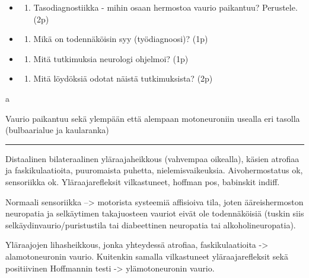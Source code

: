 \documentclass[
]{book}
\providecommand{\tightlist}{%
  \setlength{\itemsep}{0pt}\setlength{\parskip}{0pt}}
\begin{document}
\begin{itemize}
\tightlist
\item
  \begin{enumerate}
  \def\labelenumi{\alph{enumi}.}
  \tightlist
  \item
    Tasodiagnostiikka - mihin osaan hermostoa vaurio paikantuu? Perustele. (2p)
  \end{enumerate}
\item
  \begin{enumerate}
  \def\labelenumi{\alph{enumi}.}
  \setcounter{enumi}{1}
  \tightlist
  \item
    Mikä on todennäköisin syy (työdiagnoosi)? (1p)
  \end{enumerate}
\item
  \begin{enumerate}
  \def\labelenumi{\alph{enumi}.}
  \setcounter{enumi}{2}
  \tightlist
  \item
    Mitä tutkimuksia neurologi ohjelmoi? (1p)
  \end{enumerate}
\item
  \begin{enumerate}
  \def\labelenumi{\alph{enumi}.}
  \setcounter{enumi}{3}
  \tightlist
  \item
    Mitä löydöksiä odotat näistä tutkimuksista? (2p)
  \end{enumerate}
\end{itemize}

a

Vaurio paikantuu sekä ylempään että alempaan motoneuroniin usealla eri tasolla (bulbaarialue ja kaularanka)

\begin{center}\rule{0.5\linewidth}{0.5pt}\end{center}

Distaalinen bilateraalinen yläraajaheikkous (vahvempaa oikealla), käsien atrofiaa ja faskikulaatioita, puuromaista puhetta, nielemisvaikeuksia. Aivohermostatus ok, sensoriikka ok. Yläraajarefleksit vilkastuneet, hoffman pos, babinskit indiff.

Normaali sensoriikka --\textgreater{} motorista systeemiä affisioiva tila, joten ääreishermoston neuropatia ja selkäytimen takajuosteen vauriot eivät ole todennäköisiä (tuskin siis selkäydinvaurio/puristustila tai diabeettinen neuropatia tai alkoholineuropatia).

Yläraajojen lihasheikkous, jonka yhteydessä atrofiaa, faskikulaatioita -\textgreater{} alamotoneuronin vaurio. Kuitenkin samalla vilkastuneet yläraajarefleksit sekä positiivinen Hoffmannin testi -\textgreater{} ylämotoneuronin vaurio.
\end{document}
